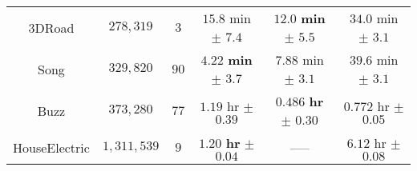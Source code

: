 \begin{tabular}{ cccccc }
  3DRoad               & $278,\!319$        & $3$   &               $15.8$ min       $\pm$ $7.4$                    &      $\mathbf{12.0}$ {\bf min} $\mathbf{\pm}$ $\mathbf{5.5}$    &       $34.0$ min $\pm$ $3.1$    \\
  Song                 & $329,\!820$        & $90$  &      $\mathbf{4.22}$ {\bf min} $\mathbf{\pm}$ $\mathbf{3.7}$  &               $7.88$ min       $\pm$ $3.1$                      &       $39.6$ min $\pm$ $3.1$    \\
  Buzz                 & $373,\!280$        & $77$  &               $1.19$ hr        $\pm$ $0.39$                   &      $\mathbf{0.486}$ {\bf hr} $\mathbf{\pm}$ $\mathbf{0.30}$   &      $0.772$ hr  $\pm$ $0.05$   \\
  HouseElectric        & $1,\!311,\!539$    & $9$   &      $\mathbf{1.20}$ {\bf hr}  $\mathbf{\pm}$ $\mathbf{0.04}$ &                -----                                            &      $6.12$  hr  $\pm$ $0.08$   \\
  \bottomrule
\end{tabular}
